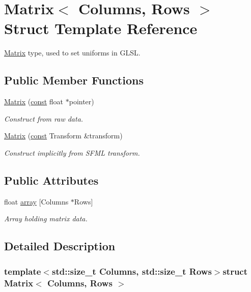 \hypertarget{struct_matrix}{\section{Matrix$<$ Columns, Rows $>$ Struct Template Reference}
\label{struct_matrix}
}


\hyperlink{struct_matrix}{Matrix} type, used to set uniforms in G\-L\-S\-L.  


\subsection*{Public Member Functions}
\begin{DoxyCompactItemize}
\item 
\hyperlink{struct_matrix_ad40da72f526bcd6854d83496d2f62e01}{Matrix} (\hyperlink{term__entry_8h_a57bd63ce7f9a353488880e3de6692d5a}{const} float $\ast$pointer)
\begin{DoxyCompactList}\small\item\em Construct from raw data. \end{DoxyCompactList}\item 
\hyperlink{struct_matrix_acc8ec3ddfe33a01f9ae7970d8fed9855}{Matrix} (\hyperlink{term__entry_8h_a57bd63ce7f9a353488880e3de6692d5a}{const} Transform \&transform)
\begin{DoxyCompactList}\small\item\em Construct implicitly from S\-F\-M\-L transform. \end{DoxyCompactList}\end{DoxyCompactItemize}
\subsection*{Public Attributes}
\begin{DoxyCompactItemize}
\item 
float \hyperlink{struct_matrix_a494cc3a7a34398ec21992ba83018d9f4}{array} \mbox{[}Columns $\ast$Rows\mbox{]}
\begin{DoxyCompactList}\small\item\em Array holding matrix data. \end{DoxyCompactList}\end{DoxyCompactItemize}


\subsection{Detailed Description}
\subsubsection*{template$<$std\-::size\-\_\-t Columns, std\-::size\-\_\-t Rows$>$struct Matrix$<$ Columns, Rows $>$}


